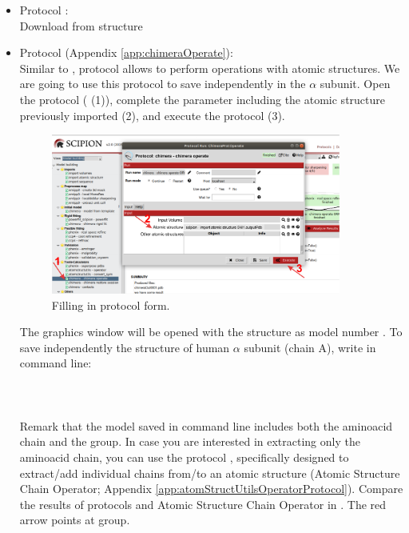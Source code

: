   \begin{itemize}
    \item Protocol :\\
    Download from  structure \\
    
    \item Protocol  (Appendix \ref{app:chimeraOperate}):\\
    Similar to \chimera {}, \chimera {} protocol allows to perform operations with atomic structures. We are going to use this protocol to save independently in \scipion the  $\alpha$ subunit. Open the protocol  ( (1)), complete the parameter  including the atomic structure  previously imported (2), and execute the protocol (3).      
    
    \begin{figure}[H]
    \centering 
    \captionsetup{width=.7\linewidth} 
    \includegraphics[width=0.90\textwidth]{Images/Fig36}
    \caption{Filling in \chimera {} protocol form.}
    \label{fig:chimera_operate_protocol}
    \end{figure}
    
    The \chimera graphics window will be opened with the structure  as model number . To save independently the structure of human  $\alpha$ subunit (chain A), write in \chimera command line:\\
    
    \\
    \\
    \\
    
    Remark that the model saved in \chimera command line includes both the aminoacid chain and the  group. In case you are interested in extracting only the aminoacid chain, you can use the protocol , specifically designed to extract/add individual chains from/to an atomic structure (Atomic Structure Chain Operator; Appendix \ref{app:atomStructUtilsOperatorProtocol}). Compare the results of protocols \chimera {} and Atomic Structure Chain Operator in . The red arrow points at  group.
    

\end{itemize}
